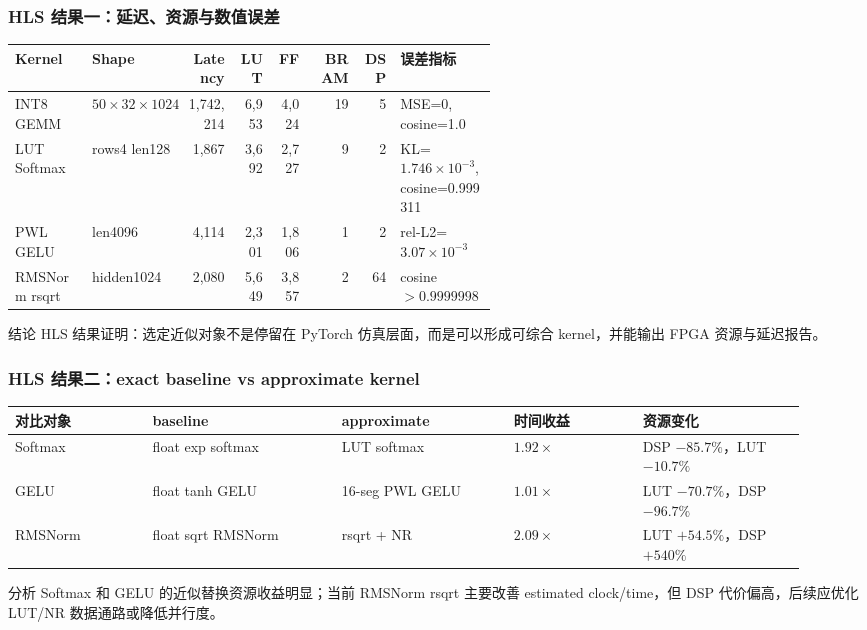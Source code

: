 \documentclass[10pt, aspectratio=169]{beamer}
\begin{document}
\begin{frame}
  \frametitle{HLS 结果一：延迟、资源与数值误差}
  \scriptsize
  \begin{table}
    \setlength{\tabcolsep}{2pt}
    \begin{tabular}{@{}p{0.16\linewidth}p{0.20\linewidth}rrrrrp{0.20\linewidth}@{}}
      \toprule
      Kernel & Shape & Latency & LUT & FF & BRAM & DSP & 误差指标 \\
      \midrule
      INT8 GEMM & $50\times32\times1024$ & 1,742,214 & 6,953 & 4,024 & 19 & 5 & MSE=0, cosine=1.0 \\
      LUT Softmax & rows4 len128 & 1,867 & 3,692 & 2,727 & 9 & 2 & KL=$1.746\times10^{-3}$, cosine=0.999311 \\
      PWL GELU & len4096 & 4,114 & 2,301 & 1,806 & 1 & 2 & rel-L2=$3.07\times10^{-3}$ \\
      RMSNorm rsqrt & hidden1024 & 2,080 & 5,649 & 3,857 & 2 & 64 & cosine $>0.9999998$ \\
      \bottomrule
    \end{tabular}
  \end{table}

  \vspace{3pt}
  \begin{alertblock}{结论}
    HLS 结果证明：选定近似对象不是停留在 PyTorch 仿真层面，而是可以形成可综合 kernel，并能输出 FPGA 资源与延迟报告。
  \end{alertblock}
\end{frame}

\begin{frame}
  \frametitle{HLS 结果二：exact baseline vs approximate kernel}
  \scriptsize
  \begin{table}
    \setlength{\tabcolsep}{2pt}
    \begin{tabular}{@{}p{0.16\linewidth}p{0.22\linewidth}p{0.20\linewidth}p{0.15\linewidth}p{0.19\linewidth}@{}}
      \toprule
      对比对象 & baseline & approximate & 时间收益 & 资源变化 \\
      \midrule
      Softmax & float exp softmax & LUT softmax & $1.92\times$ & DSP $-85.7\%$，LUT $-10.7\%$ \\
      GELU & float tanh GELU & 16-seg PWL GELU & $1.01\times$ & LUT $-70.7\%$，DSP $-96.7\%$ \\
      RMSNorm & float sqrt RMSNorm & rsqrt + NR & $2.09\times$ & LUT $+54.5\%$，DSP $+540\%$ \\
      \bottomrule
    \end{tabular}
  \end{table}

  \begin{exampleblock}{分析}
    Softmax 和 GELU 的近似替换资源收益明显；当前 RMSNorm rsqrt 主要改善 estimated clock/time，但 DSP 代价偏高，后续应优化 LUT/NR 数据通路或降低并行度。
  \end{exampleblock}
\end{frame}
\end{document}
